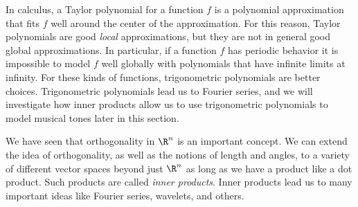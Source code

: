  \label{sec:inner_products}

\vspace*{-17 pt}

\vspace*{13 pt}


In calculus, a Taylor polynomial for a function $f$ is a polynomial approximation that fits $f$ well around the center of the approximation. For this reason, Taylor polynomials are good \emph{local} approximations, but they are not in general good global approximations. In particular, if a function $f$ has periodic behavior it is impossible to model $f$ well globally with polynomials that have infinite limits at infinity. For these kinds of functions, trigonometric polynomials are better choices. Trigonometric polynomials lead us to Fourier series, and we will investigate how inner products allow us to use trigonometric polynomials to model musical tones later in this section. 



We have seen that orthogonality in $\R^n$ is an important concept. We can extend the idea of orthogonality, as well as the notions of length and angles, to a variety of different vector spaces beyond just $\R^n$ as long as we have a product like a dot product. Such products are called \emph{inner products}. Inner products lead us to many important ideas like Fourier series, wavelets, and others.

